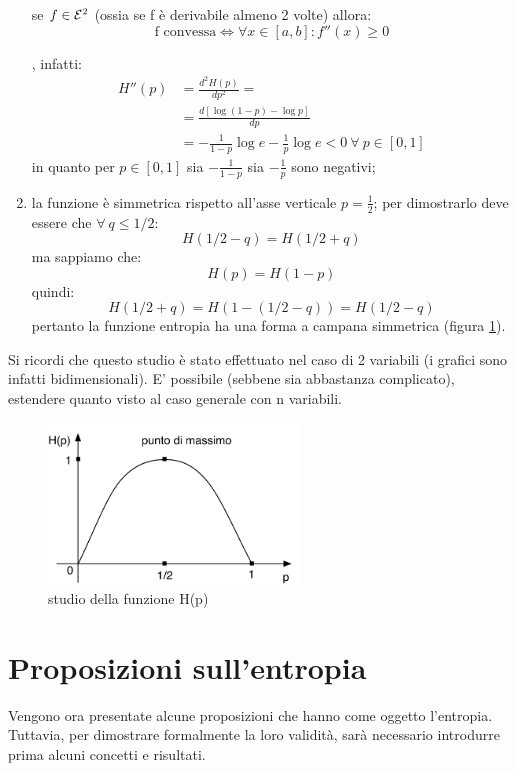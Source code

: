 \begin{enumerate}
{\begin{teorema}
se \(f \in \mathcal{E}^2\) (ossia se f è derivabile almeno 2 volte) allora:
\[\mbox{f convessa} \iff \forall x \in [a,b]: f''(x) \geq 0\]
\label{concava}
\end{teorema}
}, infatti:
\[
\begin{split} 
H''(p) &= \frac{d^2 H(p)}{dp^2} = \\ 
&= \frac{d [\log(1-p) - \log p]}{dp} \\ 
&= - \frac{1}{1-p}\log e - \frac{1}{p} \log e < 0 \ \forall \ p \in [0,1]
\end{split} 
\]
in quanto per \(p \in [0,1]\) sia \(- \frac{1}{1-p}\) sia \(- \frac{1}{p}\) sono negativi;
\item la funzione è simmetrica rispetto all'asse verticale \(p = \frac{1}{2}\); per dimostrarlo deve essere che \(\forall \ q \leq 1/2\):
\[H(1/2 - q) = H(1/2 + q)\]
ma sappiamo che:
\[H(p) = H(1-p)\]
quindi:
\[H(1/2 + q) = H(1-(1/2 - q)) = H(1/2 - q)\]
pertanto la funzione entropia ha una forma a campana simmetrica (figura \ref{fig:entropia}).
\end{enumerate}
Si ricordi che questo studio è stato effettuato nel caso di 2 variabili (i grafici sono infatti bidimensionali). E' possibile (sebbene 
sia abbastanza complicato), estendere quanto visto al caso generale con n variabili.

\begin{figure}[htbp]
\begin{center}
	\includegraphics[width=0.6\textwidth]{img/entropia.pdf}
\caption{studio della funzione H(p)}
\label{fig:entropia}
\end{center}
\end{figure}










\section{Proposizioni sull'entropia}
Vengono ora presentate alcune proposizioni che hanno come oggetto l'entropia.
Tuttavia, per dimostrare formalmente la loro validità, sarà necessario introdurre prima 
alcuni concetti e risultati.
